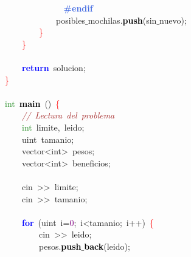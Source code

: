 \mbox{}\textbf{\textcolor{RoyalBlue}{\ \ \ \ \ \ \ \ \ \ \ \ \#endif}} \\
\mbox{}\ \ \ \ \ \ \ \ \ \ \ \ posibles$\_$mochilas\textcolor{BrickRed}{.}\textbf{\textcolor{Black}{push}}\textcolor{BrickRed}{(}sin$\_$nuevo\textcolor{BrickRed}{);} \\
\mbox{}\ \ \ \ \ \ \ \ \textcolor{Red}{\}} \\
\mbox{}\ \ \ \ \textcolor{Red}{\}} \\
\mbox{} \\
\mbox{}\ \ \ \ \textbf{\textcolor{Blue}{return}}\ solucion\textcolor{BrickRed}{;} \\
\mbox{}\textcolor{Red}{\}} \\
\mbox{} \\
\mbox{}\textcolor{ForestGreen}{int}\ \textbf{\textcolor{Black}{main}}\ \textcolor{BrickRed}{()}\ \textcolor{Red}{\{} \\
\mbox{}\ \ \ \ \textit{\textcolor{Brown}{//\ Lectura\ del\ problema}} \\
\mbox{}\ \ \ \ \textcolor{ForestGreen}{int}\ limite\textcolor{BrickRed}{,}\ leido\textcolor{BrickRed}{;} \\
\mbox{}\ \ \ \ \textcolor{TealBlue}{uint}\ tamanio\textcolor{BrickRed}{;} \\
\mbox{}\ \ \ \ \textcolor{TealBlue}{vector\textless{}int\textgreater{}}\ pesos\textcolor{BrickRed}{;} \\
\mbox{}\ \ \ \ \textcolor{TealBlue}{vector\textless{}int\textgreater{}}\ beneficios\textcolor{BrickRed}{;} \\
\mbox{} \\
\mbox{}\ \ \ \ cin\ \textcolor{BrickRed}{\textgreater{}\textgreater{}}\ limite\textcolor{BrickRed}{;} \\
\mbox{}\ \ \ \ cin\ \textcolor{BrickRed}{\textgreater{}\textgreater{}}\ tamanio\textcolor{BrickRed}{;} \\
\mbox{} \\
\mbox{}\ \ \ \ \textbf{\textcolor{Blue}{for}}\ \textcolor{BrickRed}{(}\textcolor{TealBlue}{uint}\ i\textcolor{BrickRed}{=}\textcolor{Purple}{0}\textcolor{BrickRed}{;}\ i\textcolor{BrickRed}{\textless{}}tamanio\textcolor{BrickRed}{;}\ i\textcolor{BrickRed}{++)}\ \textcolor{Red}{\{} \\
\mbox{}\ \ \ \ \ \ \ \ cin\ \textcolor{BrickRed}{\textgreater{}\textgreater{}}\ leido\textcolor{BrickRed}{;} \\
\mbox{}\ \ \ \ \ \ \ \ pesos\textcolor{BrickRed}{.}\textbf{\textcolor{Black}{push$\_$back}}\textcolor{BrickRed}{(}leido\textcolor{BrickRed}{);} \\

